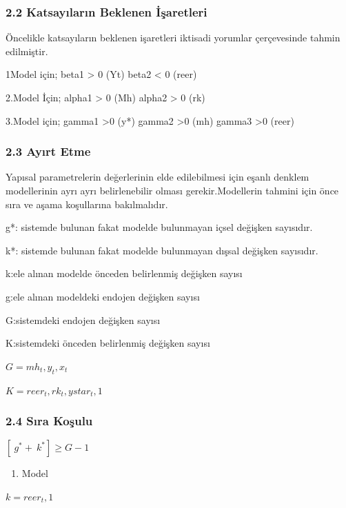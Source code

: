 \documentclass[]{article}
\providecommand{\tightlist}{%
  \setlength{\itemsep}{0pt}\setlength{\parskip}{0pt}}
\begin{document}
\subsubsection{2.2 Katsayıların Beklenen
İşaretleri}\label{katsaylarn-beklenen-isaretleri}

Öncelikle katsayıların beklenen işaretleri iktisadi yorumlar
çerçevesinde tahmin edilmiştir.

1Model için; beta1 \textgreater{} 0 (Yt) beta2 \textless{} 0 (reer)

2.Model İçin; alpha1 \textgreater{} 0 (Mh) alpha2 \textgreater{} 0 (rk)

3.Model için; gamma1 \textgreater{}0 (y*) gamma2 \textgreater{}0 (mh)
gamma3 \textgreater{}0 (reer)

\subsubsection{2.3 Ayırt Etme}\label{ayrt-etme}

Yapısal parametrelerin değerlerinin elde edilebilmesi için eşanlı
denklem modellerinin ayrı ayrı belirlenebilir olması gerekir.Modellerin
tahmini için önce sıra ve aşama koşullarına bakılmalıdır.

g*: sistemde bulunan fakat modelde bulunmayan içsel değişken sayısıdır.

k*: sistemde bulunan fakat modelde bulunmayan dışsal değişken sayısıdır.

k:ele alınan modelde önceden belirlenmiş değişken sayısı

g:ele alınan modeldeki endojen değişken sayısı

G:sistemdeki endojen değişken sayısı

K:sistemdeki önceden belirlenmiş değişken sayısı

\(G = mh_t , y_t , x_t\)

\(K = reer_t , rk_t , ystar_t , 1\)

\subsubsection{2.4 Sıra Koşulu}\label{sra-kosulu}

\([\ g^{*} + \ k^{*}] \ge G - 1\)

\begin{enumerate}
\def\labelenumi{\arabic{enumi}.}
\tightlist
\item
  Model
\end{enumerate}

\(k =reer_t , 1\)
\end{document}
